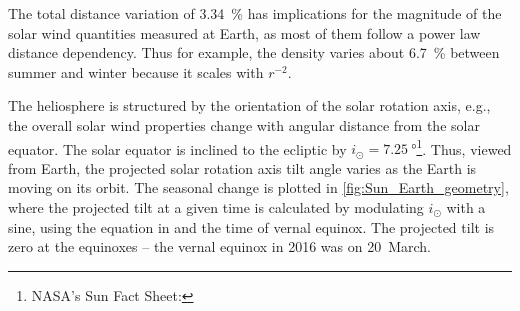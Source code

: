 The total distance variation of \SI{3.34}{\%} has implications for the magnitude of the solar wind quantities measured at Earth, as most of them follow a power law distance dependency. Thus for example, the density varies about \SI{6.7}{\percent} between summer and winter because it scales with $r^{-2}$.


% 

The heliosphere is structured by the orientation of the solar rotation axis, e.g., the overall solar wind properties change with angular distance from the solar equator. The solar equator is inclined to the ecliptic by $i_\odot = \SI{7.25}{\degree}$\footnote{NASA's Sun Fact Sheet: }. Thus, viewed from Earth, the projected solar rotation axis tilt angle varies as the Earth is moving on its orbit. The seasonal change is plotted in \autoref{fig:Sun_Earth_geometry}, where the projected tilt at a given time is calculated by modulating $i_\odot$ with a sine, using the equation in \citet{Hapgood1992} and the time of vernal equinox. The projected tilt is zero at the equinoxes -- the vernal equinox in 2016 was on 20~March.

